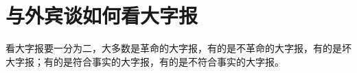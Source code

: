\section[与外宾谈如何看大字报（一九六七年一月）]{与外宾谈如何看大字报}


看大字报要一分为二，大多数是革命的大字报，有的是不革命的大字报，有的是坏大字报；有的是符合事实的大字报，有的是不符合事实的大字报。

